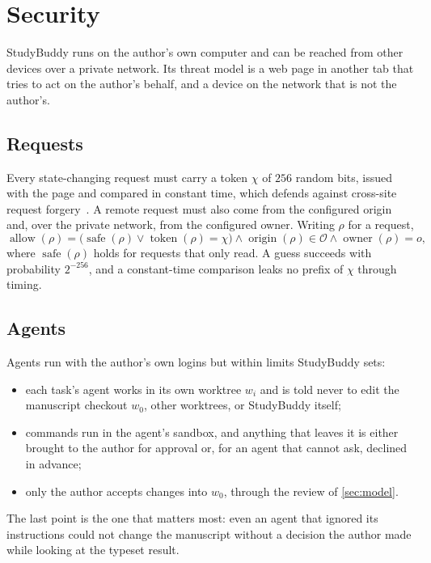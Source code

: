 \section{Security}
\label{sec:security}

StudyBuddy runs on the author's own computer and can be reached from other
devices over a private network. Its threat model is a web page in another tab
that tries to act on the author's behalf, and a device on the network that is
not the author's.

\subsection{Requests}

Every state-changing request must carry a token $\chi$ of $256$ random bits,
issued with the page and compared in constant time, which defends against
cross-site request forgery~\cite{barth2008}. A remote request must also come
from the configured origin and, over the private network, from the configured
owner. Writing $\rho$ for a request,
\begin{equation}
  \operatorname{allow}(\rho) =
  \bigl(\operatorname{safe}(\rho) \lor \operatorname{token}(\rho) = \chi\bigr)
  \land \operatorname{origin}(\rho) \in \mathcal{O}
  \land \operatorname{owner}(\rho) = o ,
  \label{eq:allow}
\end{equation}
where $\operatorname{safe}(\rho)$ holds for requests that only read. A guess
succeeds with probability $2^{-256}$, and a constant-time comparison leaks no
prefix of $\chi$ through timing.

\subsection{Agents}

Agents run with the author's own logins but within limits StudyBuddy sets:
\begin{itemize}
  \item each task's agent works in its own worktree $w_i$ and is told never to
    edit the manuscript checkout $w_0$, other worktrees, or StudyBuddy itself;
  \item commands run in the agent's sandbox, and anything that leaves it is
    either brought to the author for approval or, for an agent that cannot
    ask, declined in advance;
  \item only the author accepts changes into $w_0$, through the review of
    \cref{sec:model}.
\end{itemize}
The last point is the one that matters most: even an agent that ignored its
instructions could not change the manuscript without a decision the author
made while looking at the typeset result.
